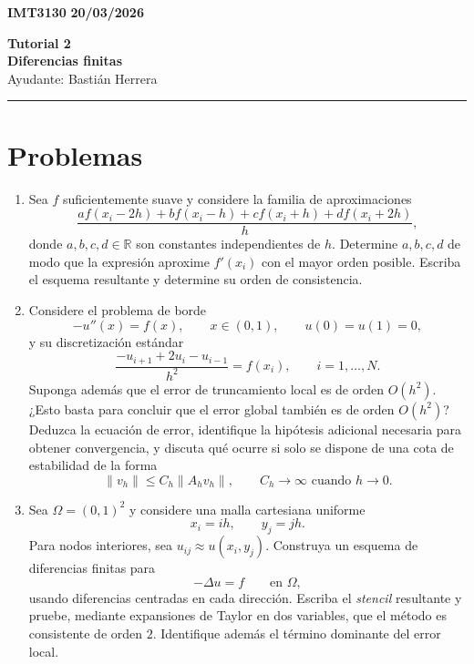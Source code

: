 \documentclass[11pt]{article}
\theoremstyle{thmstyle}
\def\R{\mathbb R}
\begin{document}
    \begin{flushleft}
        \small
        \vspace{1pt}
        \textbf{IMT3130} \hfill
        \textbf{20/03/2026}
    \end{flushleft}
    \begin{center}
        \LARGE\textbf{Tutorial 2}\\
        \vspace{3pt}
        \normalsize\textbf{Diferencias finitas}\\
        \normalsize Ayudante: Bastián Herrera 
        \rule{\textwidth}{0.05mm}
    \end{center}

\section{Problemas}

\begin{enumerate}[label=\textbf{\arabic*.}, leftmargin=*]

    \item Sea $f$ suficientemente suave y considere la familia de aproximaciones
    \[
    \frac{a f(x_i-2h)+b f(x_i-h)+c f(x_i+h)+d f(x_i+2h)}{h},
    \]
    donde $a,b,c,d\in\R$ son constantes independientes de $h$.
    Determine $a,b,c,d$ de modo que la expresión aproxime $f'(x_i)$ con el mayor orden posible. Escriba el esquema resultante y determine su orden de consistencia.

    \item Considere el problema de borde
    \[
    -u''(x)=f(x), \qquad x\in(0,1), \qquad u(0)=u(1)=0,
    \]
    y su discretización estándar
    \[
    \frac{-u_{i+1}+2u_i-u_{i-1}}{h^2}=f(x_i), \qquad i=1,\dots,N.
    \]
    Suponga además que el error de truncamiento local es de orden $O(h^2)$. ¿Esto basta para concluir que el error global también es de orden $O(h^2)$? Deduzca la ecuación de error, identifique la hipótesis adicional necesaria para obtener convergencia, y discuta qué ocurre si solo se dispone de una cota de estabilidad de la forma
    \[
    \|v_h\|\le C_h\|A_hv_h\|,
    \qquad C_h\to\infty \text{ cuando } h\to 0.
    \]

    \item Sea $\Omega=(0,1)^2$ y considere una malla cartesiana uniforme
    \[
    x_i=ih,\qquad y_j=jh.
    \]
    Para nodos interiores, sea $u_{ij}\approx u(x_i,y_j)$. Construya un esquema de diferencias finitas para
    \[
    -\Delta u=f
    \qquad \text{en } \Omega,
    \]
    usando diferencias centradas en cada dirección. Escriba el \textit{stencil} resultante y pruebe, mediante expansiones de Taylor en dos variables, que el método es consistente de orden $2$. Identifique además el término dominante del error local.

\end{enumerate}
\end{document}
